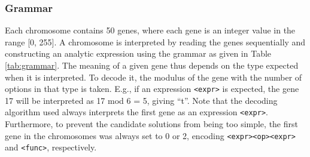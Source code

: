 \documentclass[multicolumn, 9pt]{extarticle}
\begin{document}
\subsubsection{Grammar}
Each chromosome contains 50 genes, where each gene is an integer value in the range [0, 255]. A chromosome is interpreted by reading the genes sequentially and constructing an analytic expression using the grammar as given in Table \ref{tab:grammar}. The meaning of a given gene thus depends on the type expected when it is interpreted. To decode it, the modulus of the gene with the number of options in that type is taken. E.g., if an expression \texttt{<expr>} is expected, the gene 17 will be interpreted as 17 mod 6 = 5, giving ``t''. Note that the decoding algorithm used always interprets the first gene as an expression \texttt{<expr>}.  Furthermore, to prevent the candidate solutions from being too simple, the first gene in the chromosomes was always set to 0 or 2, encoding \texttt{<expr><op><expr>} and \texttt{<func>}, respectively.
\end{document}
